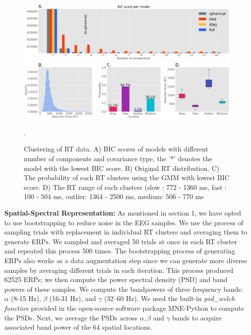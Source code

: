 \documentclass{article}
\begin{document}
\begin{figure}[ht]
\vskip 0.2in
\begin{center}
\centerline{\includegraphics[width=\columnwidth]{Images/bic_gmm_optimization}}
\caption[Clustering of RT data.]{Clustering of RT data. A) BIC scores of models with different number of components and covariance type, the '*' denotes the model with the lowest BIC score. B) Original RT distribution. C) The probability of each RT clusters using the GMM with lowest BIC score. D) The RT range of each clusters (slow : 772 - 1360 ms, fast : 100 - 504 ms, outlier: 1364 - 2500 ms, medium: 506 - 770 ms}.
\label{rt_cluster}
\end{center}
\vskip -0.2in
\end{figure}

\textbf{Spatial-Spectral Representation:} As mentioned in section 1, we have opted to use bootstrapping to reduce noise in the EEG samples. We use the process of sampling trials with replacement in individual RT clusters and averaging them to generate ERPs. We sampled and averaged 50 trials at once in each RT cluster and repeated this process 500 times. The bootstrapping process of generating ERPs also works as a data augmentation step since we can generate more diverse samples by averaging different trials in each iteration. This process produced 62525 ERPs; we then compute the power spectral density (PSD) and band powers of these samples. We compute the bandpowers of three frequency bands: $\alpha$ (8-15 Hz), $\beta$ (16-31 Hz), and $\gamma$ (32–60 Hz). We used the built-in \emph{psd\_welch function}  provided in the open-source software package MNE-Python \cite{mne} to compute the PSDs. Next, we average the PSDs across $\alpha, \beta$ and $\gamma$ bands to acquire associated band power of the 64 spatial locations.
\end{document}
